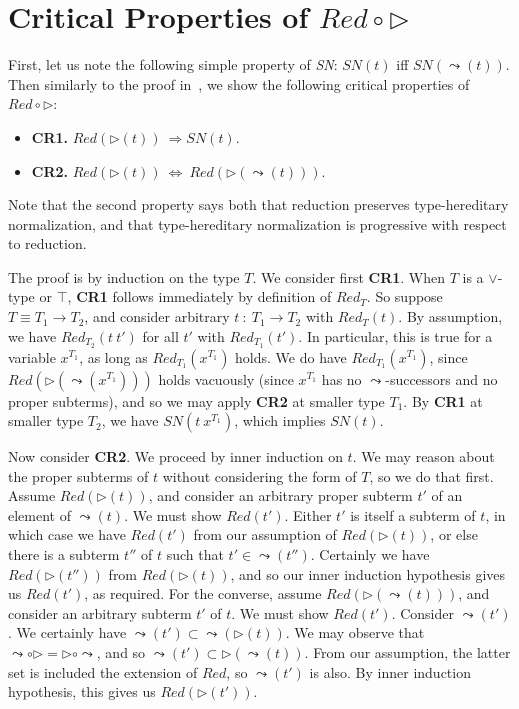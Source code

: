 \documentclass{article}
\newcommand{\red}[0]{\textit{Red}}
\newcommand{\redsub}[1]{\textit{Red}(\rhd(#1))}
\newcommand{\sn}[0]{\textit{SN}}
\newcommand{\To}{\Rightarrow}
\begin{document}
\section{Critical Properties of $\red \circ \rhd$}

First, let us note the following simple property of \sn: $\sn(t)$ iff
$\sn(\leadsto(t))$.  Then similarly to the proof in~\cite{pat}, we show
the following critical properties of $\red \circ \rhd$:

\begin{itemize}
\item \textbf{CR1.} $\redsub{t} \ \To \sn(t)$.
\item \textbf{CR2.} $\redsub{t}\ \Leftrightarrow\ \redsub{\leadsto(t)}$.
\end{itemize}

\noindent Note that the second property says both that reduction
preserves type-hereditary normalization, and that type-hereditary
normalization is progressive with respect to reduction.

The proof is by induction on the type $T$.  We consider first
\textbf{CR1}.  When $T$ is a $\vee$-type or $\top$, \textbf{CR1}
follows immediately by definition of $\red_T$.  So suppose $T \equiv
T_1\to T_2$, and consider arbitrary $t\ :\ T_1\to T_2$ with
$\red_{T}(t)$.  By assumption, we have $\red_{T_2}(t\ t')$ for all
$t'$ with $\red_{T_1}(t')$.  In particular, this is true for a
variable $x^{T_1}$, as long as $\red_{T_1}(x^{T_1})$ holds.  We do
have $\red_{T_1}(x^{T_1})$, since $\redsub{\leadsto(x^{T_1})}$ holds
vacuously (since $x^{T_1}$ has no $\leadsto$-successors and no proper
subterms), and so we may apply \textbf{CR2} at smaller type $T_1$.  By
\textbf{CR1} at smaller type $T_2$, we have $\sn(t\ x^{T_1})$, which
implies $\sn(t)$.

Now consider \textbf{CR2}.  We proceed by inner induction on $t$.  We
may reason about the proper subterms of $t$ without considering the
form of $T$, so we do that first.  Assume $\redsub{t}$, and consider
an arbitrary proper subterm $t'$ of an element of $\leadsto(t)$.  We
must show $\red(t')$.  Either $t'$ is itself a subterm of $t$, in
which case we have $\red(t')$ from our assumption of $\redsub{t}$, or
else there is a subterm $t''$ of $t$ such that $t' \in \leadsto(t'')$.
Certainly we have $\redsub{t''}$ from $\redsub{t}$, and so our inner
induction hypothesis gives us $\red(t')$, as required.  For the
converse, assume $\redsub{\leadsto(t)}$, and consider an arbitrary
subterm $t'$ of $t$.  We must show $\red(t')$.  Consider
$\leadsto(t')$.  We certainly have $\leadsto(t') \subset
\leadsto(\rhd(t))$.  We may observe that $\leadsto \circ \rhd = \rhd
\circ \leadsto$, and so $\leadsto(t') \subset \rhd(\leadsto(t))$.  From
our assumption, the latter set is included the extension of $\red$, so
$\leadsto(t')$ is also.  By inner induction hypothesis, this gives us
$\redsub{t'}$.
\end{document}

